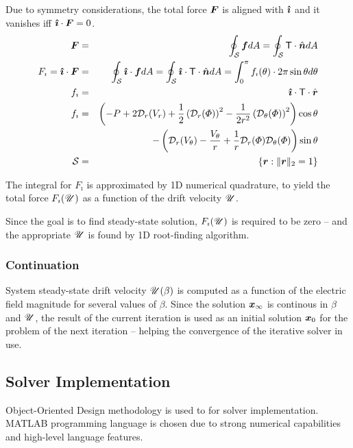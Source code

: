 Due to symmetry considerations, the total force $\boldsymbol{F}$ is 
aligned with $\boldsymbol{\hat{\imath}}$ and it vanishes iff $\boldsymbol{\hat{\imath}} \cdot \boldsymbol{F} = 0$.
\begin{eqnarray}
\boldsymbol{F} &=& \oint_\mathcal{S} \boldsymbol{f}  dA = 
\oint_\mathcal{S} \mathsf{T} \cdot \hat{\boldsymbol{n}}  dA \\
F_\imath = \boldsymbol{\hat{\imath}} \cdot \boldsymbol{F} &=& \oint_\mathcal{S} \boldsymbol{\hat{\imath}} \cdot \boldsymbol{f}  dA = 
\oint_\mathcal{S} \boldsymbol{\hat{\imath}} \cdot \mathsf{T} \cdot \hat{\boldsymbol{n}}  dA = 
\int_0^\pi f_\imath(\theta) \cdot 2\pi \sin\theta d\theta 
\\  
f_\imath &=& \boldsymbol{\hat{\imath}} \cdot \mathsf{T} \cdot \hat{\boldsymbol{r}}
\\  
f_\imath &=& \left(-P + 2\mathcal{D}_r(V_r) + 
\frac{1}{2}\left(\mathcal{D}_r(\varPhi)\right)^2 - \frac{1}{2r^2}\left(\mathcal{D}_\theta(\varPhi)\right)^2\right)\cos\theta 
\\  
&& -\left(\mathcal{D}_r(V_\theta) - \frac{V_\theta}{r}
+ \frac{1}{r}\mathcal{D}_r(\varPhi) \mathcal{D}_{\theta}(\varPhi)\right)\sin\theta \\
 \mathcal{S} &=& \{\boldsymbol{r} : \|\boldsymbol{r}\|_2 = 1\}
\end{eqnarray}

The integral for $F_\imath$ is approximated by 1D numerical quadrature, to yield 
the total force $F_\imath(\mathscr{U})$ as a function of the drift velocity $\mathscr{U}$.

Since the goal is to find steady-state solution, $F_\imath(\mathscr{U})$ is required to be zero --
and the appropriate $\mathscr{U}$ is found by 1D root-finding algorithm.

\subsubsection{Continuation}

System steady-state drift velocity $\mathscr{U}(\beta)$ is computed as a function 
of the electric field magnitude for several values of $\beta$.
Since the solution $\boldsymbol{x}_\infty$ is continous in $\beta$ and $\mathscr{U}$, 
the result of the current iteration is used as an initial solution $\boldsymbol{x}_0$ for the problem 
of the next iteration -- helping the convergence of the iterative solver in use.

\subsection{Solver Implementation}

Object-Oriented Design methodology is used to for solver implementation.
MATLAB programming language is chosen due to strong numerical capabilities
and high-level language features.

